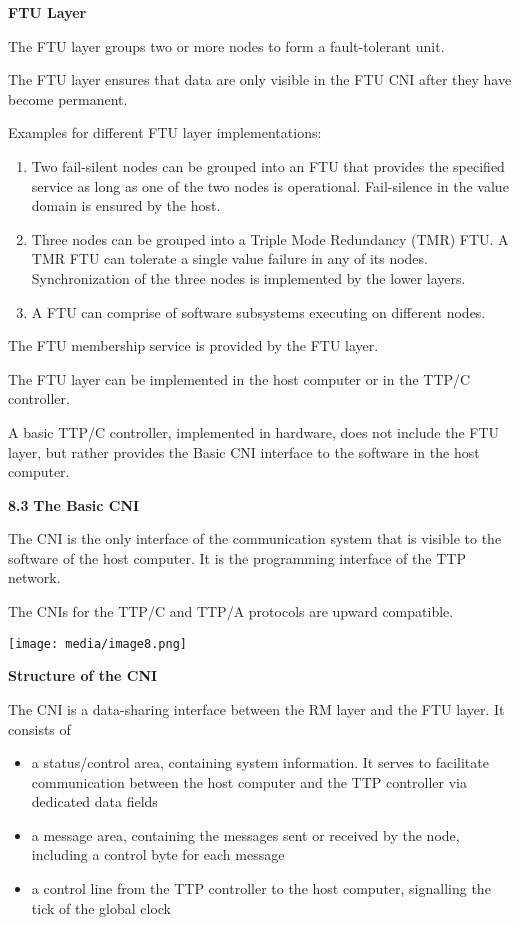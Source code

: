 \textbf{FTU Layer}

The FTU layer groups two or more nodes to form a fault-tolerant unit.

The FTU layer ensures that data are only visible in the FTU CNI after
they have become permanent.

Examples for different FTU layer implementations:

\begin{enumerate}
\def\labelenumi{\arabic{enumi}.}
\item
  Two fail-silent nodes can be grouped into an FTU that provides the
  specified service as long as one of the two nodes is operational.
  Fail-silence in the value domain is ensured by the host.
\item
  Three nodes can be grouped into a Triple Mode Redundancy (TMR) FTU. A
  TMR FTU can tolerate a single value failure in any of its nodes.
  Synchronization of the three nodes is implemented by the lower layers.
\item
  A FTU can comprise of software subsystems executing on different
  nodes.
\end{enumerate}

The FTU membership service is provided by the FTU layer.

The FTU layer can be implemented in the host computer or in the TTP/C
controller.

A basic TTP/C controller, implemented in hardware, does not include the
FTU layer, but rather provides the Basic CNI interface to the software
in the host computer.

\textbf{8.3} \protect\hypertarget{teil4}{}{}\textbf{The Basic CNI }

The CNI is the only interface of the communication system that is
visible to the software of the host computer. It is the programming
interface of the TTP network.

The CNIs for the TTP/C and TTP/A protocols are upward compatible.

\texttt{[image: media/image8.png]}

\textbf{Structure of the CNI}

The CNI is a data-sharing interface between the RM layer and the FTU
layer. It consists of

\begin{itemize}
\item
  a status/control area, containing system information. It serves to
  facilitate communication between the host computer and the TTP
  controller via dedicated data fields
\item
  a message area, containing the messages sent or received by the node,
  including a control byte for each message
\item
  a control line from the TTP controller to the host computer,
  signalling the tick of the global clock
\end{itemize}

